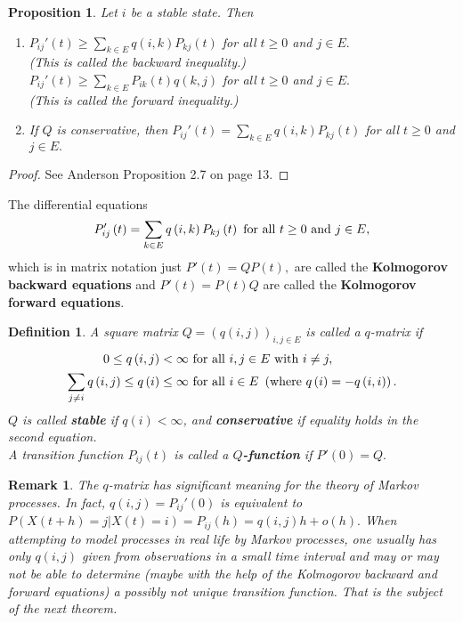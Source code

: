 \documentclass[12pt,a4paper]{scrartcl}
\newtheorem{definition}[theorem]{Definition}
\newtheorem{proposition}[theorem]{Proposition}
\newtheorem {remark}[theorem]{Remark}
\numberwithin{equation}{section}
\begin{document}
\begin{proposition}
Let $i$ be a stable state. Then
\begin{enumerate}[(1)]
\item $P_{ij}'\left(t\right) \geq \sum_{k \in E} q\left(i,k\right) P_{kj}\left(t\right)$ for all $t\geq0$ and $j\in E.$ \\
(This is called the backward inequality.) \\
$P_{ij}'\left(t\right) \geq \sum_{k \in E} P_{ik}\left(t\right) q\left(k,j\right) $ for all $t\geq0$ and $j\in E.$ \\
(This is called the forward inequality.)
\item If $Q$ is conservative, then $P_{ij}'\left(t\right) = \sum_{k \in E} q\left(i,k\right) P_{kj}\left(t\right)$ for all $t\geq0$ and $j \in E.$
\end{enumerate}
\end{proposition}
\begin{proof}
See Anderson \cite{anderson} Proposition 2.7 on page 13.
\end{proof}

The differential equations 
$$ P_{ij}'\left(t\right) = \sum_{k \in E} q\left(i,k\right) P_{kj}\left(t\right) \textnormal{ for all } t\geq0 \textnormal{ and } j\in E,$$
which is in matrix notation just $P'\left(t\right) = Q P\left(t\right),$ are called the \textbf{Kolmogorov backward equations} and $P'\left(t\right) = P\left(t\right)Q$ are called the \textbf{Kolmogorov forward equations}.

\begin{definition}
A square matrix $ Q = \left(q\left(i,j\right)\right)_{i,j \in E} $ is called a $q$-matrix if
\begin{align*}
0 \leq q\left(i,j\right) < \infty & \textnormal{ for all } i,j \in E \textnormal{ with } i \neq j, \\
\sum_{j \neq i} q\left(i,j\right) \leq q\left(i\right) \leq \infty &\textnormal{ for all } i \in E \ \left(\textnormal{where } q\left(i\right) = -q\left(i,i\right)\right).
\end{align*}
$Q$ is called \textbf{stable} if $q\left(i\right) <  \infty$, and \textbf{conservative} if equality holds in the second equation. \\
A transition function $P_{ij}\left(t\right)$ is called a \textbf{$Q$-function} if $P'\left(0\right) = Q.$
\end{definition}

\begin{remark}
The $q$-matrix has significant meaning for the theory of Markov processes. In fact, $q\left(i,j\right) = P_{ij}'\left(0\right) $ is equivalent to $ P\left(X\left(t+h\right) = j | X\left(t\right) = i \right) = P_{ij}\left(h\right) = q\left(i,j\right)h + o\left(h\right).$ When attempting to model processes in real life by Markov processes, one usually has only $q\left(i,j\right)$ given from observations in a small time interval and may or may not be able to determine (maybe with the help of the Kolmogorov backward and forward equations) a possibly not unique transition function. That is the subject of the next theorem.
\end{remark}
\end{document}
